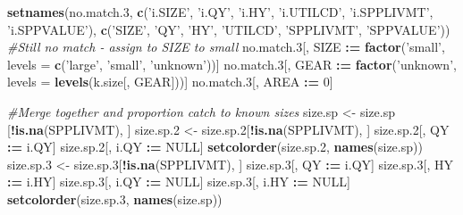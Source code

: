 \documentclass[]{article}
\newenvironment{Shaded}{\begin{snugshade}}{\end{snugshade}}
\newcommand{\KeywordTok}[1]{\textcolor[rgb]{0.13,0.29,0.53}{\textbf{#1}}}
\newcommand{\DataTypeTok}[1]{\textcolor[rgb]{0.13,0.29,0.53}{#1}}
\newcommand{\DecValTok}[1]{\textcolor[rgb]{0.00,0.00,0.81}{#1}}
\newcommand{\StringTok}[1]{\textcolor[rgb]{0.31,0.60,0.02}{#1}}
\newcommand{\CommentTok}[1]{\textcolor[rgb]{0.56,0.35,0.01}{\textit{#1}}}
\newcommand{\OtherTok}[1]{\textcolor[rgb]{0.56,0.35,0.01}{#1}}
\newcommand{\OperatorTok}[1]{\textcolor[rgb]{0.81,0.36,0.00}{\textbf{#1}}}
\newcommand{\ErrorTok}[1]{\textcolor[rgb]{0.64,0.00,0.00}{\textbf{#1}}}
\newcommand{\NormalTok}[1]{#1}
\begin{document}
\begin{Shaded}
\begin{Highlighting}[]
  \KeywordTok{setnames}\NormalTok{(no.match.}\DecValTok{3}\NormalTok{, }\KeywordTok{c}\NormalTok{(}\StringTok{'i.SIZE'}\NormalTok{, }\StringTok{'i.QY'}\NormalTok{, }\StringTok{'i.HY'}\NormalTok{, }\StringTok{'i.UTILCD'}\NormalTok{, }\StringTok{'i.SPPLIVMT'}\NormalTok{, }\StringTok{'i.SPPVALUE'}\NormalTok{), }
                       \KeywordTok{c}\NormalTok{(}\StringTok{'SIZE'}\NormalTok{,   }\StringTok{'QY'}\NormalTok{,   }\StringTok{'HY'}\NormalTok{,  }\StringTok{'UTILCD'}\NormalTok{,  }\StringTok{'SPPLIVMT'}\NormalTok{, }\StringTok{'SPPVALUE'}\NormalTok{))}
  \CommentTok{#Still no match - assign to SIZE to small}
\NormalTok{  no.match.}\DecValTok{3}\NormalTok{[, SIZE }\OperatorTok{:}\ErrorTok{=}\StringTok{ }\KeywordTok{factor}\NormalTok{(}\StringTok{'small'}\NormalTok{, }\DataTypeTok{levels =} \KeywordTok{c}\NormalTok{(}\StringTok{'large'}\NormalTok{, }\StringTok{'small'}\NormalTok{, }\StringTok{'unknown'}\NormalTok{))]}
\NormalTok{  no.match.}\DecValTok{3}\NormalTok{[, GEAR }\OperatorTok{:}\ErrorTok{=}\StringTok{ }\KeywordTok{factor}\NormalTok{(}\StringTok{'unknown'}\NormalTok{, }\DataTypeTok{levels =} \KeywordTok{levels}\NormalTok{(k.size[, GEAR]))]}
\NormalTok{  no.match.}\DecValTok{3}\NormalTok{[, AREA }\OperatorTok{:}\ErrorTok{=}\StringTok{ }\DecValTok{0}\NormalTok{]}
  
  \CommentTok{#Merge together and proportion catch to known sizes}
\NormalTok{  size.sp   <-}\StringTok{ }\NormalTok{size.sp  [}\OperatorTok{!}\KeywordTok{is.na}\NormalTok{(SPPLIVMT), ]}
\NormalTok{  size.sp.}\DecValTok{2}\NormalTok{ <-}\StringTok{ }\NormalTok{size.sp.}\DecValTok{2}\NormalTok{[}\OperatorTok{!}\KeywordTok{is.na}\NormalTok{(SPPLIVMT), ]}
\NormalTok{  size.sp.}\DecValTok{2}\NormalTok{[, QY   }\OperatorTok{:}\ErrorTok{=}\StringTok{ }\NormalTok{i.QY]}
\NormalTok{  size.sp.}\DecValTok{2}\NormalTok{[, i.QY }\OperatorTok{:}\ErrorTok{=}\StringTok{ }\OtherTok{NULL}\NormalTok{]}
  \KeywordTok{setcolorder}\NormalTok{(size.sp.}\DecValTok{2}\NormalTok{, }\KeywordTok{names}\NormalTok{(size.sp))}
\NormalTok{  size.sp.}\DecValTok{3}\NormalTok{ <-}\StringTok{ }\NormalTok{size.sp.}\DecValTok{3}\NormalTok{[}\OperatorTok{!}\KeywordTok{is.na}\NormalTok{(SPPLIVMT), ]}
\NormalTok{  size.sp.}\DecValTok{3}\NormalTok{[, QY     }\OperatorTok{:}\ErrorTok{=}\StringTok{ }\NormalTok{i.QY]}
\NormalTok{  size.sp.}\DecValTok{3}\NormalTok{[, HY     }\OperatorTok{:}\ErrorTok{=}\StringTok{ }\NormalTok{i.HY]}
\NormalTok{  size.sp.}\DecValTok{3}\NormalTok{[, i.QY }\OperatorTok{:}\ErrorTok{=}\StringTok{ }\OtherTok{NULL}\NormalTok{]}
\NormalTok{  size.sp.}\DecValTok{3}\NormalTok{[, i.HY }\OperatorTok{:}\ErrorTok{=}\StringTok{ }\OtherTok{NULL}\NormalTok{]}
  \KeywordTok{setcolorder}\NormalTok{(size.sp.}\DecValTok{3}\NormalTok{, }\KeywordTok{names}\NormalTok{(size.sp))}
  

\end{Highlighting}
\end{Shaded}
\end{document}
